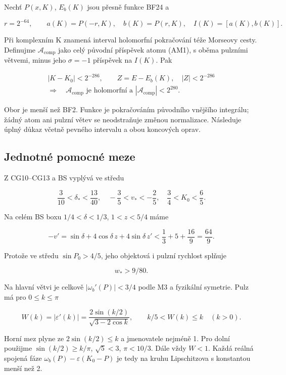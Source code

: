 \documentclass[11pt,a4paper]{article}
\theoremstyle{remark}\newtheorem{remark}[theorem]{Poznámka}
\numberwithin{equation}{section}
\begin{document}
Nechť \(P(x,K)\), \(E_b(K)\) jsou přesně funkce BF24 a

\[
r=2^{-64},\qquad
a(K)=P(-r,K),\quad b(K)=P(r,K),\quad I(K)=[a(K),b(K)].
\tag{AM2}
\]

Při komplexním K znamená interval holomorfní pokračování téže Morseovy
cesty. Definujme \(\mathcal A_{\mathrm{comp}}\) jako celý původní
příspěvek atomu (AM1), s oběma pulzními větvemi, minus jeho
\(\sigma=-1\) příspěvek na \(I(K)\). Pak

\[
\boxed{\begin{gathered}
|K-K_0|<2^{-286},\qquad
Z=E-E_b(K),\quad |Z|<2^{-286}\\
\Longrightarrow\quad
\mathcal A_{\mathrm{comp}}\text{ je holomorfní a }
|\mathcal A_{\mathrm{comp}}|<2^{280}.
\end{gathered}}
\tag{AM3}
\]

Obor je menší než BF2. Funkce je pokračováním původního vnějšího
integrálu; žádný atom ani pulzní větev se neodstraňuje změnou
normalizace. Následuje úplný důkaz včetně pevného intervalu a obou
koncových oprav.

\hypertarget{jednotnuxe9-pomocnuxe9-meze}{%
\subsection{Jednotné pomocné meze}\label{jednotnuxe9-pomocnuxe9-meze}}

Z CG10--CG13 a BS vyplývá ve středu

\[
\frac3{10}<\delta_*<\frac{13}{40},\quad
-\frac35<v_*<-\frac25,\quad
\frac34<K_0<\frac65.
\]

Na celém BS boxu \(1/4<\delta<1/3\), \(1<z<5/4\) máme

\[
-v'=\sin\delta+4\cos\delta\,z+4\sin\delta\,z'
<\frac13+5+\frac{16}{9}=\frac{64}{9}.
\]

Protože ve středu \(\sin P_0>4/5\), jeho objektová i pulzní rychlost
splňuje

\[
\boxed{w_* >9/80.}
\tag{AM4}
\]

Na hlavní větvi je celkově \(|\omega_b'(P)|<3/4\) podle M3 a fyzikální
symetrie. Pulz má pro \(0\le k\le\pi\)

\[
W(k)=|\varepsilon'(k)|
=\frac{2\sin(k/2)}{\sqrt{3-2\cos k}},
\qquad
\boxed{k/5<W(k)\le k\quad(k>0).}
\tag{AM5}
\]

Horní mez plyne ze \(2\sin(k/2)\le k\) a jmenovatele nejméně 1. Pro
dolní použijme \(\sin(k/2)\ge k/\pi\), \(\sqrt5<3\), \(\pi<10/3\). Dále
vždy \(W<1\). Každá reálná spojená fáze
\(\omega_b(P)-\varepsilon(K_0-P)\) je tedy na kruhu Lipschitzova s
konstantou menší než 2.
\end{document}
